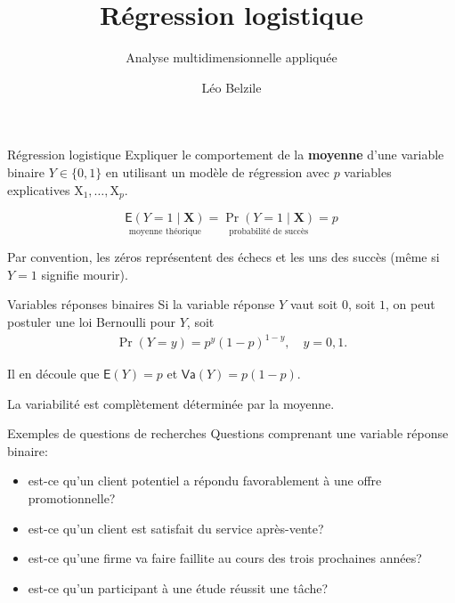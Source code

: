 \documentclass[
  ignorenonframetext,
]{beamer}
\title{\texorpdfstring{Régression logistique}{Régression logistique}}
\subtitle{\texorpdfstring{Analyse multidimensionnelle
appliquée}{Analyse multidimensionnelle appliquée}}
\author{Léo Belzile}
\date{}
\institute{HEC Montréal}
\providecommand{\tightlist}{%
  \setlength{\itemsep}{0pt}\setlength{\parskip}{0pt}}
\begin{document}
\frame{\titlepage}


\begin{frame}{Régression logistique}
\protect{}\label{ruxe9gression-logistique}
Expliquer le comportement de la \textbf{moyenne} d'une variable binaire
\(Y\in\{0,1\}\) en utilisant un modèle de régression avec \(p\)
variables explicatives \(\mathrm{X}_1, \ldots, \mathrm{X}_p\).

\[\underset{\text{moyenne théorique}}{\mathsf{E}(Y=1 \mid \mathbf{X})} = \underset{\text{probabilité de succès}}{\Pr(Y=1 \mid \mathbf{X})}=p\]

Par convention, les zéros représentent des échecs et les uns des succès
(même si \(Y=1\) signifie mourir).
\end{frame}

\begin{frame}{Variables réponses binaires}
\protect{}\label{variables-ruxe9ponses-binaires}
Si la variable réponse \(Y\) vaut soit \(0\), soit \(1\), on peut
postuler une loi Bernoulli pour \(Y\), soit \begin{align*}
\Pr(Y=y) = p^y (1-p)^{1-y}, \quad y=0, 1.
\end{align*}

Il en découle que \(\mathsf{E}(Y)=p\) et \(\mathsf{Va}(Y)=p(1-p)\).

La variabilité est complètement déterminée par la moyenne.
\end{frame}

\begin{frame}{Exemples de questions de recherches}
\protect{}\label{exemples-de-questions-de-recherches}
Questions comprenant une variable réponse binaire:

\begin{itemize}
\tightlist
\item
  est-ce qu'un client potentiel a répondu favorablement à une offre
  promotionnelle?
\item
  est-ce qu'un client est satisfait du service après-vente?
\item
  est-ce qu'une firme va faire faillite au cours des trois prochaines
  années?
\item
  est-ce qu'un participant à une étude réussit une tâche?
\end{itemize}
\end{frame}
\end{document}
